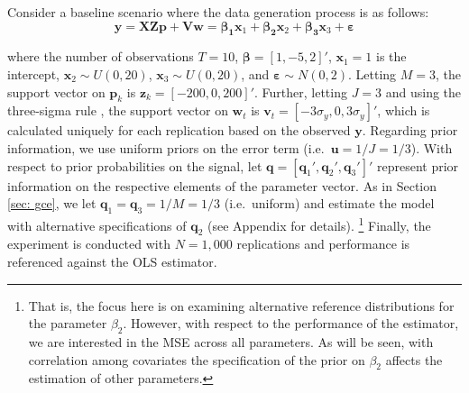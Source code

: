 \documentclass[english]{article}
\begin{document}
Consider a baseline scenario where the data generation process is as follows:
\begin{equation}
\mathbf{y} = \mathbf{XZp} + \mathbf{Vw}
= \mathbf{\beta_1}\mathbf{x}_1 + \mathbf{\beta_2}\mathbf{x}_2
+ \mathbf{\beta_3}\mathbf{x}_3 + \mathbf{\varepsilon} 
\end{equation}

\noindent
where the number of observations $T=10$, $\mathbf{\beta}=[1, -5, 2]'$,
$\mathbf{x}_1=1$ is the intercept, $\mathbf{x}_2 \sim U(0,20)$, 
$\mathbf{x}_3 \sim U(0,20)$, and $\mathbf{\varepsilon}\sim N(0,2)$.
Letting $M=3$, the support vector on $\mathbf{p}_k$ is $\mathbf{z}_k 
= [- 200, 0, 200]'$.
Further, letting $J=3$ and using the three-sigma rule 
\citep{pukelsheim1994}, the support vector on $\mathbf{w}_t$ is 
$\mathbf{v}_t = [- 3\sigma_y, 0, 3\sigma_y]'$, which is calculated uniquely 
for each replication based on the observed $\mathbf{y}$.
Regarding prior information, we use uniform priors on the error term (i.e.\ 
$\mathbf{u} = 1/J = 1/3$).
With respect to prior probabilities on the signal, let $\mathbf{q} = 
[\mathbf{q}_1', \mathbf{q}_2', \mathbf{q}_3']'$ represent prior 
information on the respective elements of the parameter vector.
As in Section \ref{sec: gce}, we let $\mathbf{q}_1 = \mathbf{q}_3 = 1/M 
= 1/3$ (i.e.\ uniform) and estimate the model with alternative specifications 
of $\mathbf{q}_2$ (see Appendix for details).%
\footnote{That is, the focus here is on examining alternative reference 
distributions for the parameter $\beta_2$. 
However, with respect to the performance of the estimator, we are 
interested in the MSE across all parameters.
As will be seen, with correlation among covariates the specification of the 
prior on $\beta_2$ affects the estimation of other parameters.}
Finally, the experiment is conducted with $N=1,000$ replications and 
performance is referenced against the OLS estimator.

\end{document}
